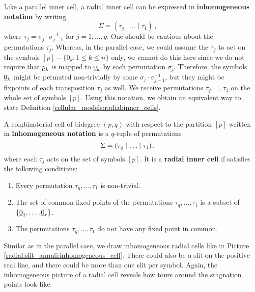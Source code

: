 Like a parallel inner cell, a radial inner cell can be expressed in \textbf{inhomogeneous notation} by writing
\[
    \Sigma = (\tau_q \mid \ldots \mid \tau_1)\,,
\]
where $\tau_j = \sigma_j \cdot \sigma_{j-1}^{-1}$ for $j = 1, \dotsc, q$. 
One should be cautious about the permutations $\tau_j$.
Whereas, in the parallel case, we could assume the $\tau_j$ to act on the symbols $[p] - \{0_k \colon 1 \leq k \leq n\}$ only,
we cannot do this here since we do not require that $\underline{\smash{p}}_k$ is mapped to $\underline{\smash{0}}_k$ by each permutation $\sigma_j$.
Therefore, the symbols $\underline{\smash{0}}_k$ might be permuted non-trivially by some $\sigma_j \cdot \sigma_{j-1}^{-1}$, 
but they might be fixpoints of each transposition $\tau_j$ as well.
We receive permutations $\tau_q, \dotsc, \tau_1$ on the whole set of symbols $[p]$.
Using this notation, we obtain an equivalent way to state Definition \ref{cellular_models:radial:inner_cells}.

\begin{defi}
    \label{cellular_models:radial:inhomogeneous_notation}
    A combinatorial cell of bidegree $(p,q)$ with respect to the partition $[p]$ written in {\bf inhomogeneous notation}
    is a $q$-tuple of permutations
    \[
        \Sigma = \inhomq \,,
    \]
    where each $\tau_j$ acts on the set of symbols $[p]$.
    It is a {\bf radial inner cell} if satisfies the following conditions:
    \begin{enumerate}
        \item Every permutation $\tau_q, \ldots, \tau_1$ is non-trivial.
        \item The set of common fixed points of the permutations $\tau_q, \ldots, \tau_1$ is a subset of $\{ \ul0_1, \ldots, \ul0_r\}$.
        \item The permutations $\tau_q, \ldots, \tau_1$ do not have any fixed point in common.
    \end{enumerate}
\end{defi}

Similar as in the parallel case, we draw inhomogeneous radial cells like in Picture \ref{radial:slit_annuli:inhomogeneous_cell}.
There could also be a slit on the positive real line, and there could be more than one slit per symbol.
Again, the inhomogeneous picture of a radial cell reveals how tours around the stagnation points look like.

